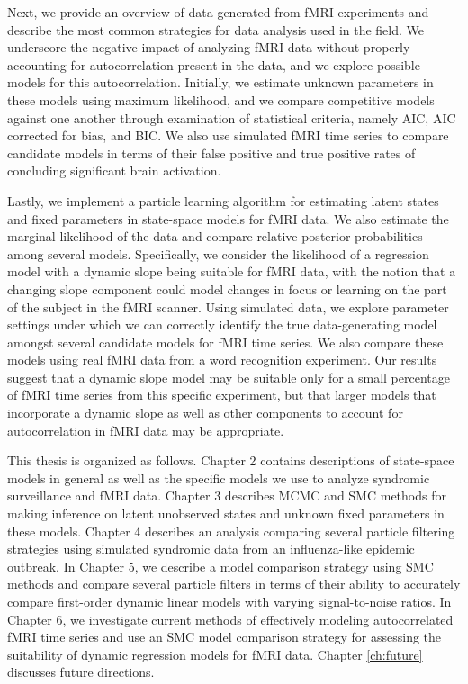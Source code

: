 Next, we provide an overview of data generated from fMRI experiments and describe the most common strategies for data analysis used in the field. We underscore the negative impact of analyzing fMRI data without properly accounting for autocorrelation present in the data, and we explore possible models for this autocorrelation. Initially, we estimate unknown parameters in these models using maximum likelihood, and we compare competitive models against one another through examination of statistical criteria, namely AIC, AIC corrected for bias, and BIC. We also use simulated fMRI time series to compare candidate models in terms of their false positive and true positive rates of concluding significant brain activation.

Lastly, we implement a particle learning algorithm for estimating latent states and fixed parameters in state-space models for fMRI data. We also estimate the marginal likelihood of the data and compare relative posterior probabilities among several models. Specifically, we consider the likelihood of a regression model with a dynamic slope being suitable for fMRI data, with the notion that a changing slope component could model changes in focus or learning on the part of the subject in the fMRI scanner. Using simulated data, we explore parameter settings under which we can correctly identify the true data-generating model amongst several candidate models for fMRI time series. We also compare these models using real fMRI data from a word recognition experiment. Our results suggest that a dynamic slope model may be suitable only for a small percentage of fMRI time series from this specific experiment, but that larger models that incorporate a dynamic slope as well as other components to account for autocorrelation in fMRI data may be appropriate.

This thesis is organized as follows. Chapter 2 contains descriptions of state-space models in general as well as the specific models we use to analyze syndromic surveillance and fMRI data. Chapter 3 describes MCMC and SMC methods for making inference on latent unobserved states and unknown fixed parameters in these models. Chapter 4 describes an analysis comparing several particle filtering strategies using simulated syndromic data from an influenza-like epidemic outbreak. In Chapter 5, we describe a model comparison strategy using SMC methods and compare several particle filters in terms of their ability to accurately compare first-order dynamic linear models with varying signal-to-noise ratios. In Chapter 6, we investigate current methods of effectively modeling autocorrelated fMRI time series and use an SMC model comparison strategy for assessing the suitability of dynamic regression models for fMRI data. Chapter \ref{ch:future} discusses future directions.